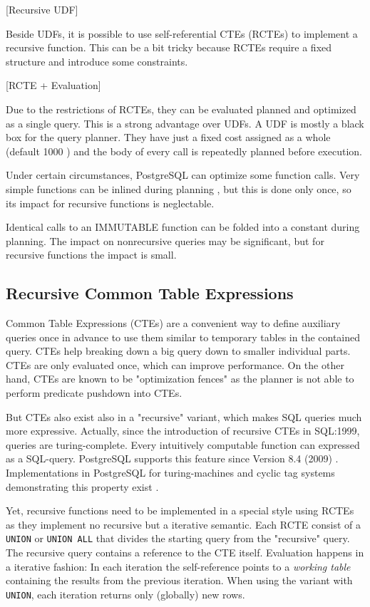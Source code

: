 [Recursive UDF]

Beside UDFs, it is possible to use self-referential CTEs (RCTEs) to implement a recursive function. This can be a bit tricky because RCTEs require a fixed structure and introduce some constraints.

[RCTE + Evaluation]

Due to the restrictions of RCTEs, they can be evaluated planned and optimized as a single query. This is a strong advantage over UDFs. A UDF is mostly a black box for the query planner. They have just a fixed cost assigned as a whole (default 1000 \cite[p. 1435]{psql}) and the body of every call is repeatedly planned before execution.

Under certain circumstances, PostgreSQL can optimize some function calls. Very simple functions can be inlined during planning \cite{psqlWikiUDFinlining}, but this is done only once, so its impact for recursive functions is neglectable. 

Identical calls to an IMMUTABLE function can be folded into a constant during planning. The impact on nonrecursive queries may be significant, but for recursive functions the impact is small.

\subsection{Recursive Common Table Expressions}

Common Table Expressions (CTEs) are a convenient way to define auxiliary queries once in advance to use them similar to temporary tables in the contained query. CTEs help breaking down a big query down to smaller individual parts. CTEs are only evaluated once, which can improve performance. On the other hand, CTEs are known to be "optimization fences" as the planner is not able to perform predicate pushdown into CTEs.

But CTEs also exist also in a "recursive" variant, which makes SQL queries much more expressive. Actually, since the introduction of recursive CTEs in SQL:1999, queries are turing-complete. Every intuitively computable function can expressed as a SQL-query. PostgreSQL supports this feature since Version 8.4 (2009) \cite[p. 2811]{psql}. Implementations in PostgreSQL for turing-machines and cyclic tag systems demonstrating this property exist \cite{psqlWikiCTS, psqlWikiTM}.

Yet, recursive functions need to be implemented in a special style using RCTEs as they implement no recursive but a iterative semantic. Each RCTE consist of a \texttt{UNION} or \texttt{UNION ALL} that divides the starting query from the "recursive" query. The recursive query contains a reference to the CTE itself. Evaluation happens in a iterative fashion: In each iteration the self-reference points to a \textit{working table} containing the results from the previous iteration. When using the variant with \texttt{UNION}, each iteration returns only (globally) new rows.

